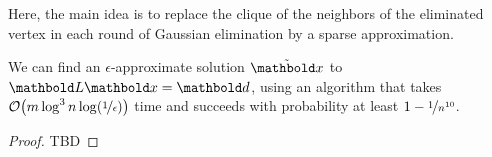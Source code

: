Here, the main idea is to replace the clique of the neighbors of the eliminated vertex in each round of Gaussian elimination by a sparse approximation.

\begin{thm} We can find an $\epsilon$-approximate solution $\Tilde{\vx}$ to $\mL\vx = \vd$, using an algorithm that takes $\LandauO{m \log^3 n \log(\nicefrac{1}{\epsilon})}$ time and succeeds with probability at least $1 - \nicefrac{1}{n^{10}}$.
\end{thm}
\begin{proof}
TBD
\end{proof}